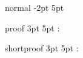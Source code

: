

\newtheoremstyle
{normal}        %
{-2pt}          %
{5pt}           %
{\normalfont}   %
{}              %
{}     %
{}              %
{\newline}      %
{\hspace{-1.95pt}\underline{\hspace{1.95pt}\bfseries{}\bfseries{}\normalfont{}}\vspace{0.2em}}              %

\newtheoremstyle
{proof}         %
{3pt}           %
{5pt}           %
{\normalfont}   %
{}              %
{\itshape}      %
{:}             %
{\newline}      %
{}              %

\newtheoremstyle
{shortproof}    %
{3pt}           %
{5pt}           %
{\normalfont}   %
{}              %
{\itshape}      %
{:}             %
{ }      		%
{}              %



\makeatletter
\newlength{\savedparskip}
\newlength{\savedparindent}
\makeatother

